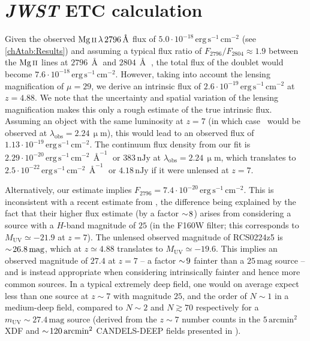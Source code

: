 \section{\textit{JWST} ETC calculation}
\label{appAsec:JWST ETC calculation}

Given the observed $\MgII \, \lambda \, 2796 \, \Angstrom$ flux of $5.0 \cdot 10^{-18} \, \mathrm{erg \, s^{-1} \, cm^{-2}}$ (see \cref{chAtab:Results}) and assuming a typical flux ratio of $F_{2796}/F_{2804} \approx 1.9$ between the $\MgII$ lines at $2796 \, \Angstrom$ and $2804 \, \Angstrom$ \citep[e.g.][]{2018ApJ...855...96H}, the total flux of the doublet would become $7.6 \cdot 10^{-18} \, \mathrm{erg \, s^{-1} \, cm^{-2}}$. However, taking into account the lensing magnification of $\mu = 29$, we derive an intrinsic flux of $2.6 \cdot 10^{-19} \, \mathrm{erg \, s^{-1} \, cm^{-2}}$ at $z=4.88$. We note that the uncertainty and spatial variation of the lensing magnification makes this only a rough estimate of the true intrinsic flux. Assuming an object with the same luminosity at $z = 7$ (in which case \MgII\ would be observed at $\lambda_\text{obs} = 2.24 \, \mathrm{\upmu m}$), this would lead to an observed flux of $1.13 \cdot 10^{-19} \, \mathrm{erg \, s^{-1} \, cm^{-2}}$. The continuum flux density from our fit is $2.29 \cdot 10^{-20} \, \mathrm{erg \, s^{-1} \, cm^{-2} \, \Angstrom^{-1}}$ or $383 \, \mathrm{nJy}$ at $\lambda_\text{obs} = 2.24 \, \mathrm{\upmu m}$, which translates to $2.5 \cdot 10^{-22} \, \mathrm{erg \, s^{-1} \, cm^{-2} \, \Angstrom^{-1}}$ or $4.18 \, \mathrm{nJy}$ if it were unlensed at $z=7$.

Alternatively, our estimate implies $F_{2796} = 7.4 \cdot 10^{-20} \, \mathrm{erg \, s^{-1} \, cm^{-2}}$. This is inconsistent with a recent estimate from \citet{2020MNRAS.498.2554C}, the difference being explained by the fact that their higher flux estimate (by a factor $\sim \! 8$) arises from considering a source with a $H$-band magnitude of $25$ (in the F160W filter; this corresponds to $M_\mathrm{UV} \simeq -21.9$ at $z=7$). The unlensed observed magnitude of RCS0224z5 is $\sim \! 26.8 \, \mathrm{mag}$, which at $z \simeq 4.88$ translates to $M_\mathrm{UV} \simeq -19.6$. This implies an observed magnitude of $27.4$ at $z=7$ -- a factor $\sim \! 9$ fainter than a $25 \, \mathrm{mag}$ source -- and is instead appropriate when considering intrinsically fainter and hence more common sources. In a typical extremely deep field, one would on average expect less than one source at $z \sim 7$ with magnitude $25$, and the order of $N \sim 1$ in a medium-deep field, compared to $N \sim 2$ and $N \gtrsim 70$ respectively for a $m_\text{UV} \sim 27.4 \, \mathrm{mag}$ source (derived from the $z \sim 7$ number counts in the $5 \, \mathrm{arcmin^2}$ XDF and $\sim \! 120 \, \mathrm{arcmin^2}$ CANDELS-DEEP fields presented in \citealt{2015ApJ...803...34B}).

